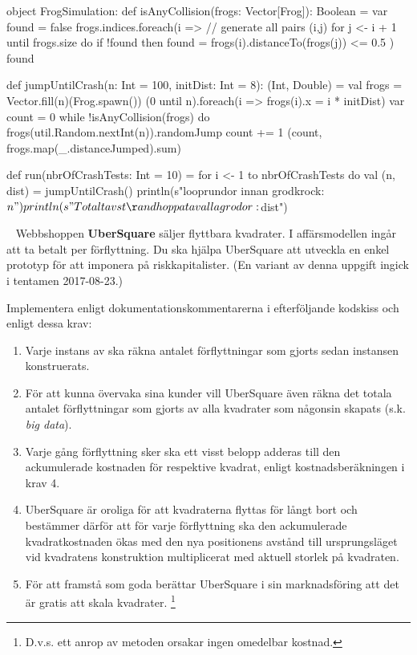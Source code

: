 \SubtaskSolved
\begin{Code}
object FrogSimulation:
  def isAnyCollision(frogs: Vector[Frog]): Boolean =
    var found = false
    frogs.indices.foreach(i =>  // generate all pairs (i,j)
      for j <- i + 1 until frogs.size do
        if !found then
          found = frogs(i).distanceTo(frogs(j)) <= 0.5
    )
    found

  def jumpUntilCrash(n: Int = 100, initDist: Int = 8): (Int, Double) =
    val frogs = Vector.fill(n)(Frog.spawn())
    (0 until n).foreach(i => frogs(i).x = i * initDist)
    var count = 0
    while !isAnyCollision(frogs) do
      frogs(util.Random.nextInt(n)).randomJump
      count += 1
    (count, frogs.map(_.distanceJumped).sum)


  def run(nbrOfCrashTests: Int = 10) =
    for i <- 1 to nbrOfCrashTests do
      val (n, dist) = jumpUntilCrash()
      println(s"\nAntalet looprundor innan grodkrock: $n")
      println(s"Totalt avstånd hoppat av alla grodor: $dist")
\end{Code}

\QUESTEND




\QUESTBEGIN

\Task  \what~  Webbshoppen \textbf{UberSquare} säljer flyttbara kvadrater. I affärsmodellen ingår att ta betalt per förflyttning. Du ska hjälpa UberSquare att utveckla en enkel prototyp för att imponera på riskkapitalister. (En variant av denna uppgift ingick i tentamen 2017-08-23.)

\Subtask Implementera  enligt dokumentationskommentarerna i efterföljande kodskiss och enligt dessa krav:

\begin{enumerate}%
   \item Varje instans av  ska räkna antalet förflyttningar som gjorts sedan instansen konstruerats.

   \item För att kunna övervaka sina kunder vill UberSquare även räkna det totala antalet förflyttningar som gjorts av alla kvadrater som någonsin skapats (s.k. \emph{big data}).

  \item Varje gång förflyttning sker ska ett visst belopp adderas till den ackumulerade kostnaden för respektive kvadrat, enligt kostnadsberäkningen i krav 4.

  \item UberSquare är oroliga för att kvadraterna flyttas för långt bort och bestämmer därför att för varje förflyttning ska den ackumulerade kvadratkostnaden ökas med den nya positionens avstånd till ursprungsläget vid kvadratens konstruktion multiplicerat med aktuell storlek på kvadraten.

  \item För att framstå som goda berättar UberSquare i sin marknadsföring att det är gratis att skala kvadrater. \footnote{D.v.s. ett anrop av metoden  orsakar ingen omedelbar kostnad.}
\end{enumerate}

